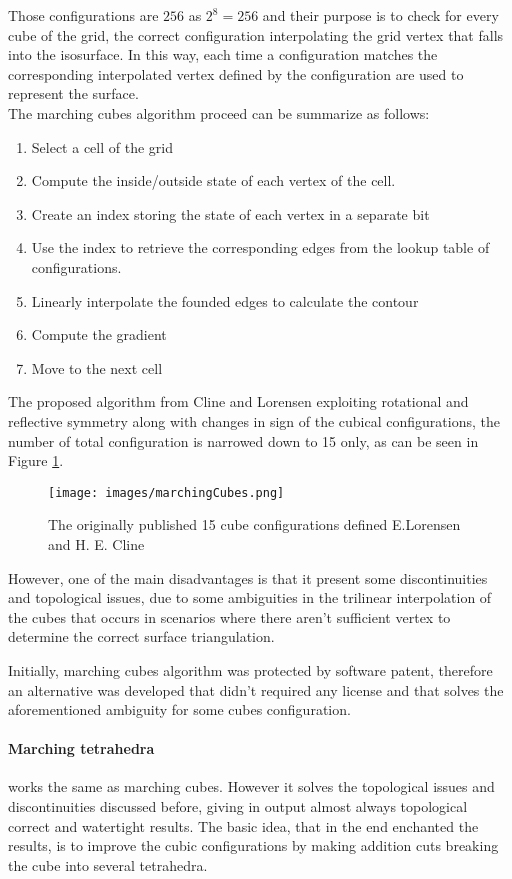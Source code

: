 \documentclass[12pt,a4paper]{extarticle}
\begin{document}
Those configurations are $256$ as $2^8 = 256$ and their purpose is to check for every cube of the grid, the correct configuration interpolating the grid vertex that falls into the isosurface. In this way, each time a configuration matches the corresponding interpolated vertex defined by the configuration are used to represent the surface.\\
The marching cubes algorithm proceed can be summarize as follows:
\begin{enumerate}
\item Select a cell of the grid
\item Compute the inside/outside state of each vertex of the cell.
\item Create an index storing the state of each vertex in a separate bit
\item Use the index to retrieve the corresponding edges from the lookup table of configurations.
\item Linearly interpolate the founded edges to calculate the contour
\item Compute the gradient
\item Move to the next cell
\end{enumerate}

The proposed algorithm from Cline and Lorensen exploiting rotational and reflective symmetry along with changes in sign of the cubical configurations, the number of total configuration is narrowed down to 15 only, as can be seen in Figure \ref{fig:marchingcubes_configs}. 

\begin{figure}[hbtp]
\centering
\texttt{[image: images/marchingCubes.png]}
\caption{The originally published 15 cube configurations defined E.Lorensen and H. E. Cline}
\label{fig:marchingcubes_configs}
\end{figure}

However, one of the main disadvantages is that it present some discontinuities and topological issues, due to some ambiguities in the trilinear interpolation of the cubes that occurs in scenarios where there aren't sufficient vertex to determine the correct surface triangulation. %

Initially, marching cubes algorithm was protected by software patent, therefore an alternative was developed that didn't required any license and that solves the aforementioned ambiguity for some cubes configuration.

\paragraph{Marching tetrahedra} works the same as marching cubes. However it solves the topological issues and discontinuities discussed before, giving in output almost always topological correct and watertight results.
The basic idea, that in the end enchanted the results, is to improve the cubic configurations by making addition cuts breaking the cube into several tetrahedra.
\end{document}
